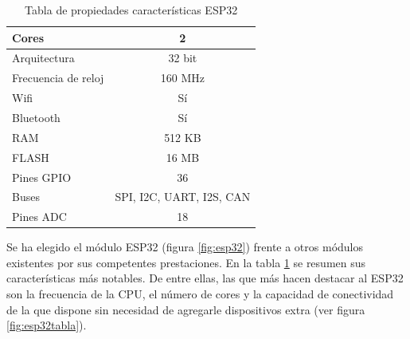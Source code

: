 \begin{table}[H]
	\centering
	\begin{tabular}{|l|c|}
		\hline
		{\cellcolor[HTML]{EFEFEF}Cores}                                      & 2                             	\\ \hline
		{\cellcolor[HTML]{EFEFEF}Arquitectura}                               & 32 bit                         	\\ \hline
		{\cellcolor[HTML]{EFEFEF}Frecuencia de reloj} 						 & 160 MHz 							\\ \hline
		{\cellcolor[HTML]{EFEFEF}Wifi}                                       & Sí                             \\ \hline
		{\cellcolor[HTML]{EFEFEF}Bluetooth}                                  & Sí                             \\ \hline
		{\cellcolor[HTML]{EFEFEF}RAM}                                        & 512 KB                         \\ \hline
		{\cellcolor[HTML]{EFEFEF}FLASH}                                      & 16 MB                          \\ \hline
		{\cellcolor[HTML]{EFEFEF}Pines GPIO}                                 & 36                             \\ \hline
		{\cellcolor[HTML]{EFEFEF}Buses}                                      & SPI, I2C, UART, I2S, CAN       \\ \hline
		{\cellcolor[HTML]{EFEFEF}Pines ADC}                                  & 18                             \\ \hline
		
	\end{tabular}
	\caption{Tabla de propiedades características ESP32}
	\label{tabla:ESP32}
\end{table}

Se ha elegido el módulo ESP32 (figura \ref{fig:esp32}) frente a otros módulos existentes por sus competentes prestaciones. En la tabla \ref{tabla:ESP32} se resumen sus características más notables. De entre ellas, las que más hacen destacar al ESP32 son la frecuencia de la CPU, el número de cores y la capacidad de conectividad de la que dispone sin necesidad de agregarle dispositivos extra (ver figura \ref{fig:esp32tabla}).


